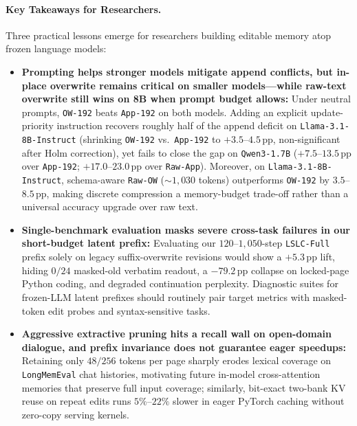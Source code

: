 \documentclass[10pt]{article}
\newcommand{\pp}{\,\text{pp}}
\renewcommand{\_}{\origunderscore\allowbreak}
\begin{document}
\paragraph{Key Takeaways for Researchers.}
Three practical lessons emerge for researchers building editable memory atop frozen language models:
\begin{itemize}
    \item \textbf{Prompting helps stronger models mitigate append conflicts, but in-place overwrite remains critical on smaller models---while raw-text overwrite still wins on 8B when prompt budget allows:} Under neutral prompts, \texttt{OW-192} beats \texttt{App-192} on both models. Adding an explicit update-priority instruction recovers roughly half of the append deficit on \texttt{Llama-3.1-8B-Instruct} (shrinking \texttt{OW-192} vs.\ \texttt{App-192} to $+3.5$--$4.5\pp$, non-significant after Holm correction), yet fails to close the gap on \texttt{Qwen3-1.7B} ($+7.5$--$13.5\pp$ over \texttt{App-192}; $+17.0$--$23.0\pp$ over \texttt{Raw-App}). Moreover, on \texttt{Llama-3.1-8B-Instruct}, schema-aware \texttt{Raw-OW} ($\sim 1{,}030$ tokens) outperforms \texttt{OW-192} by $3.5$--$8.5\pp$, making discrete compression a memory-budget trade-off rather than a universal accuracy upgrade over raw text.
    \item \textbf{Single-benchmark evaluation masks severe cross-task failures in our short-budget latent prefix:} Evaluating our $120$--$1{,}050$-step \texttt{LSLC-Full} prefix solely on legacy suffix-overwrite revisions would show a $+5.3\pp$ lift, hiding $0/24$ masked-old verbatim readout, a $-79.2\pp$ collapse on locked-page Python coding, and degraded continuation perplexity. Diagnostic suites for frozen-LLM latent prefixes should routinely pair target metrics with masked-token edit probes and syntax-sensitive tasks.
    \item \textbf{Aggressive extractive pruning hits a recall wall on open-domain dialogue, and prefix invariance does not guarantee eager speedups:} Retaining only $48/256$ tokens per page sharply erodes lexical coverage on \texttt{LongMemEval} chat histories, motivating future in-model cross-attention memories that preserve full input coverage; similarly, bit-exact two-bank KV reuse on repeat edits runs $5\%$--$22\%$ slower in eager PyTorch caching without zero-copy serving kernels.
\end{itemize}
\end{document}
